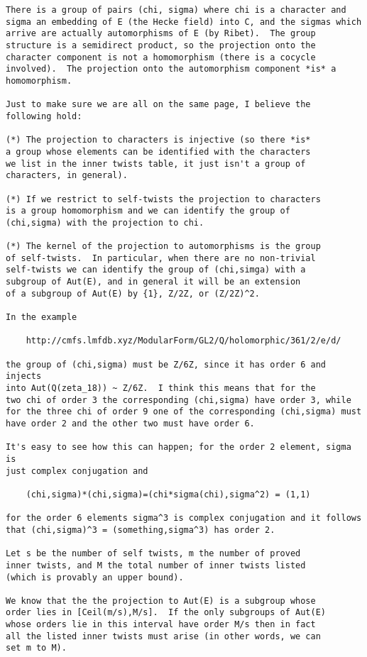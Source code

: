 \documentclass[11pt]{amsart}
\numberwithin{equation}{subsection}
\theoremstyle{plain}
\theoremstyle{definition}
\begin{document}
\begin{verbatim}
There is a group of pairs (chi, sigma) where chi is a character and sigma an embedding of E (the Hecke field) into C, and the sigmas which arrive are actually automorphisms of E (by Ribet).  The group structure is a semidirect product, so the projection onto the character component is not a homomorphism (there is a cocycle involved).  The projection onto the automorphism component *is* a homomorphism.

Just to make sure we are all on the same page, I believe the
following hold:

(*) The projection to characters is injective (so there *is*
a group whose elements can be identified with the characters
we list in the inner twists table, it just isn't a group of
characters, in general).

(*) If we restrict to self-twists the projection to characters
is a group homomorphism and we can identify the group of
(chi,sigma) with the projection to chi.

(*) The kernel of the projection to automorphisms is the group
of self-twists.  In particular, when there are no non-trivial
self-twists we can identify the group of (chi,simga) with a
subgroup of Aut(E), and in general it will be an extension
of a subgroup of Aut(E) by {1}, Z/2Z, or (Z/2Z)^2.

In the example

    http://cmfs.lmfdb.xyz/ModularForm/GL2/Q/holomorphic/361/2/e/d/

the group of (chi,sigma) must be Z/6Z, since it has order 6 and injects
into Aut(Q(zeta_18)) ~ Z/6Z.  I think this means that for the
two chi of order 3 the corresponding (chi,sigma) have order 3, while
for the three chi of order 9 one of the corresponding (chi,sigma) must
have order 2 and the other two must have order 6.

It's easy to see how this can happen; for the order 2 element, sigma is
just complex conjugation and

    (chi,sigma)*(chi,sigma)=(chi*sigma(chi),sigma^2) = (1,1)

for the order 6 elements sigma^3 is complex conjugation and it follows
that (chi,sigma)^3 = (something,sigma^3) has order 2.

Let s be the number of self twists, m the number of proved
inner twists, and M the total number of inner twists listed
(which is provably an upper bound).

We know that the the projection to Aut(E) is a subgroup whose
order lies in [Ceil(m/s),M/s].  If the only subgroups of Aut(E)
whose orders lie in this interval have order M/s then in fact
all the listed inner twists must arise (in other words, we can
set m to M).
\end{verbatim}
\end{document}
